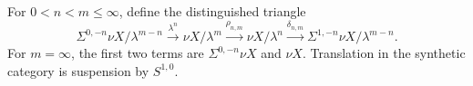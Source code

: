 \begin{definition}
  \label{def:lambda-rho-delta-triangle}
  \notready
  For $0<n<m\le\infty$, define the distinguished triangle
  \[
    \Sigma^{0,-n}\nu X/\lambda^{m-n}
      \xrightarrow{\lambda^n}\nu X/\lambda^m
      \xrightarrow{\rho_{n,m}}\nu X/\lambda^n
      \xrightarrow{\delta_{n,m}}
      \Sigma^{1,-n}\nu X/\lambda^{m-n}.
  \]
  For $m=\infty$, the first two terms are
  $\Sigma^{0,-n}\nu X$ and $\nu X$.  Translation in the synthetic category is
  suspension by $S^{1,0}$.
\end{definition}
